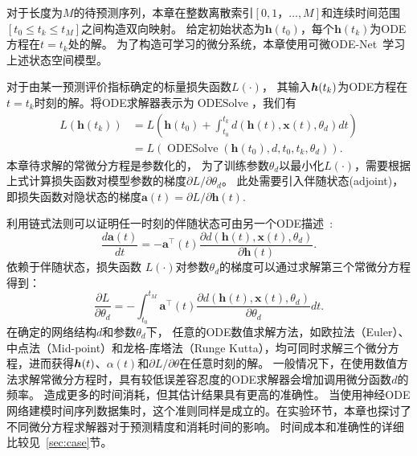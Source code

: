 对于长度为$M$的待预测序列，本章在整数离散索引$[0,1，\dots,M]$和连续时间范围$[t_0\leq t_k \leq t_{M}]$之间构造双向映射。
给定初始状态为$\boldsymbol{h}(t_0)$，每个$\boldsymbol{h}(t_k)$为ODE方程在$t=t_k$处的解。
为了构造可学习的微分系统，本章使用可微ODE-Net~\cite{NIPS2018_7892}学习上述状态空间模型。

对于由某一预测评价指标确定的标量损失函数$L(\cdot)$，
其输入$\boldsymbol{h}(t_k)$为ODE方程在$t=t_k$时刻的解。将ODE求解器表示为$\operatorname{ODESolve}$，我们有
\begin{align}
\label{equ:loss_ode_solver}
L\left(\boldsymbol{h}\left(t_{k}\right)\right)&=L\left(\boldsymbol{h}\left(t_{0}\right)+\int_{t_{0}}^{t_{k}} d(\boldsymbol{h}(t), \boldsymbol x(t), \theta_d) d t\right)\nonumber\\
&=L\left(\operatorname{ODESolve}\left(\boldsymbol{h}\left(t_{0}\right), d, t_{0}, t_{k}, \theta_d \right)\right).
\end{align}
本章待求解的常微分方程是参数化的，
为了训练参数$\theta _d$以最小化$L(\cdot)$，需要根据上式计算损失函数对模型参数的梯度$\partial L / \partial \theta _d$。
此处需要引入伴随状态(adjoint)，即损失函数对隐状态的梯度$\boldsymbol{a}(t)=\partial L / \partial \boldsymbol{h}(t)$.

利用链式法则可以证明任一时刻的伴随状态可由另一个ODE描述~\cite{NIPS2018_7892}:
\begin{equation}
\label{equ:ode_at}
\frac{d \boldsymbol{a}(t)}{d t}=-\boldsymbol{a}^{\top}(t) \frac{\partial d(\boldsymbol{h}(t), \boldsymbol x(t), \theta_d)}{\partial \boldsymbol{h}(t)}.
\end{equation}
依赖于伴随状态，损失函数 $L(\cdot)$对参数$\theta _d$的梯度可以通过求解第三个常微分方程得到：
\begin{equation}
\label{equ:grad_ode}
\frac{\partial L}{\partial \theta _d}=-\int_{t_0}^{t_{M}} \boldsymbol{a}^{\top}(t) \frac{\partial d(\boldsymbol{h}(t), \boldsymbol x(t), \theta _d)}{\partial \theta_d} d t.
\end{equation}
在确定的网络结构$d$和参数$\theta _d$下，
任意的ODE数值求解方法，如欧拉法（Euler）、中点法（Mid-point）和龙格-库塔法（Runge Kutta），均可同时求解三个微分方程，进而获得$\boldsymbol h (t)$、$\alpha (t)$和${\partial L}/{\partial \theta}$在任意时刻的解。
一般情况下，在使用数值方法求解常微分方程时，具有较低误差容忍度的ODE求解器会增加调用微分函数$d$的频率。
造成更多的时间消耗，但其估计结果具有更高的准确性。
当使用神经ODE网络建模时间序列数据集时，这个准则同样是成立的。在实验环节，本章也探讨了不同微分方程求解器对于预测精度和消耗时间的影响。
时间成本和准确性的详细比较见~\ref{sec:case}节。

